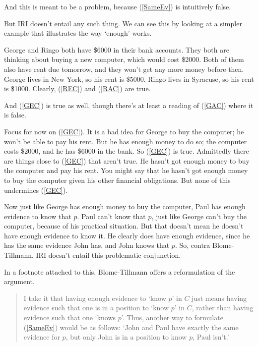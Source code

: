 \noindent And this is meant to be a problem, because (\ref{SameEv}) is intuitively false.

But IRI doesn't entail any such thing. We can see this by looking at a simpler example that illustrates the way `enough' works. 

George and Ringo both have \$6000 in their bank accounts. They both are thinking about buying a new computer, which would cost \$2000. Both of them also have rent due tomorrow, and they won't get any more money before then. George lives in New York, so his rent is \$5000. Ringo lives in Syracuse, so his rent is \$1000. Clearly, (\ref{REC}) and (\ref{RAC}) are true.


\noindent And (\ref{GEC}) is true as well, though there's at least a reading of (\ref{GAC}) where it is false.


\noindent Focus for now on (\ref{GEC}). It is a bad idea for George to buy the computer; he won't be able to pay his rent. But he has enough money to do so; the computer costs \$2000, and he has \$6000 in the bank. So (\ref{GEC}) is true. Admittedly there are things close to (\ref{GEC}) that aren't true. He hasn't got enough money to buy the computer and pay his rent. You might say that he hasn't got enough money to buy the computer given his other financial obligations. But none of this undermines (\ref{GEC}). 

Now just like George has enough money to buy the computer, Paul has enough evidence to know that $p$. Paul can't know that $p$, just like George can't buy the computer, because of his practical situation. But that doesn't mean he doesn't have enough evidence to know it. He clearly does have enough evidence, since he has the same evidence John has, and John knows that $p$. So, contra Blome-Tillmann, IRI doesn't entail this problematic conjunction.

In a footnote attached to this, Blome-Tillmann offers a reformulation of the argument.

\begin{quote}
\noindent I take it that having enough evidence to `know $p$' in $C$ just means having evidence such that one is in a position to `know $p$' in $C$, rather than having evidence such that one `knows $p$'. Thus, another way to formulate (\ref{SameEv}) would be as follows: `John and Paul have exactly the same evidence for $p$, but only John is in a position to know $p$, Paul isn't.' \cite[329n23]{MBT2009}
\end{quote}

